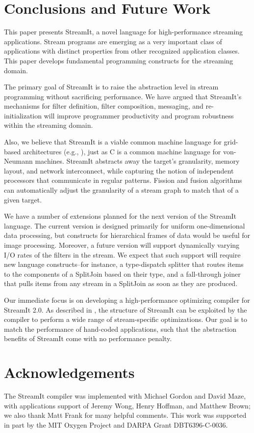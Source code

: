 \section{Conclusions and Future Work}
\label{sec:conc}

This paper presents StreamIt, a novel language for high-performance
streaming applications.  Stream programs are emerging as a very
important class of applications with distinct properties from other
recognized application classes.  This paper develops fundamental
programming constructs for the streaming domain.

The primary goal of StreamIt is to raise the abstraction level in
stream programming without sacrificing performance.  We have argued
that StreamIt's mechanisms for filter definition, filter composition,
messaging, and re-initialization will improve programmer productivity
and program robustness within the streaming domain.

Also, we believe that StreamIt is a viable common machine language for
grid-based architectures (e.g., \cite{smartmemories,rawshort,trips}),
just as C is a common machine language for von-Neumann machines.
StreamIt abstracts away the target's granularity, memory layout, and
network interconnect, while capturing the notion of independent
processors that communicate in regular patterns.  Fission and fusion
algorithms can automatically adjust the granularity of a stream graph
to match that of a given target.

We have a number of extensions planned for the next version of the
StreamIt language.  The current version is designed primarily for
uniform one-dimensional data processing, but constructs for hierarchical
frames of data would be useful for image processing.  Moreover, a future
version will support dynamically varying I/O rates of the filters in the
stream.  We expect that such support will require new language
constructs--for instance, a type-dispatch splitter that routes items to
the components of a SplitJoin based on their type, and a fall-through
joiner that pulls items from any stream in a SplitJoin as soon as they
are produced.

Our immediate focus is on developing a high-performance optimizing
compiler for StreamIt 2.0.  As described in \cite{streamittech622},
the structure of StreamIt can be exploited by the compiler to perform
a wide range of stream-specific optimizations.  Our goal is to match
the performance of hand-coded applications, such that the abstraction
benefits of StreamIt come with no performance penalty.

\section*{Acknowledgements}

The StreamIt compiler was implemented with Michael Gordon and David
Maze, with applications support of Jeremy Wong, Henry Hoffman, and
Matthew Brown; we also thank Matt Frank for many helpful comments.
This work was supported in part by the MIT Oxygen Project and DARPA
Grant DBT6396-C-0036.
